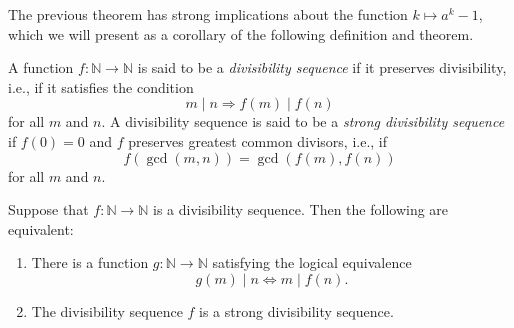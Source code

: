The previous theorem has strong implications about the function $k\mapsto a^k-1$, which we will present as a corollary of the following definition and theorem.

\begin{definition}
  A function $f:\mathbb{N}\to\mathbb{N}$ is said to be a \emph{divisibility sequence} if it preserves divisibility, i.e., if it satisfies the condition
  \begin{equation*}
    m\mid n \Rightarrow f(m)\mid f(n)
  \end{equation*}
  for all $m$ and $n$. A divisibility sequence is said to be a \emph{strong divisibility sequence} if $f(0)=0$ and $f$ preserves greatest common divisors, i.e., if
  \begin{equation*}
    f(\gcd(m,n))=\gcd(f(m),f(n))
  \end{equation*}
  for all $m$ and $n$.
\end{definition}

\begin{theorem}\label{theorem:galois-connections-divisibility}
  Suppose that $f:\mathbb{N}\to\mathbb{N}$ is a divisibility sequence. Then the following are equivalent:
  \begin{enumerate}
  \item There is a function $g:\mathbb{N}\to\mathbb{N}$ satisfying the logical equivalence
  \begin{equation*}
    g(m)\mid n \Leftrightarrow m\mid f(n).
  \end{equation*}
  \item The divisibility sequence $f$ is a strong divisibility sequence.
  \end{enumerate}
\end{theorem}

